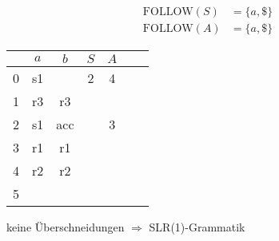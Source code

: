 \documentclass[a4paper,10pt]{scrartcl}
\begin{document}
\begin{align*}
    \text{FOLLOW}(S) &= \{a,\$\} \\
    \text{FOLLOW}(A) &= \{a,\$\}
\end{align*}
\begin{center}
    \begin{tabular}{c|c|c|c||c|c|c}
        & $a$   & $b$   & $S$ & $A$ \\\hline\hline
    0   & s1    &       & 2   & 4   \\\hline
    1   & r3    & r3    &     &     \\\hline
    2   & s1    & acc   &     & 3   \\\hline
    3   & r1    & r1    &     &     \\\hline
    4   & r2    & r2    &     &     \\\hline
    5   &       &       &     &     \\
    \end{tabular}
\end{center}
keine Überschneidungen $\Rightarrow$ SLR(1)-Grammatik
\end{document}
